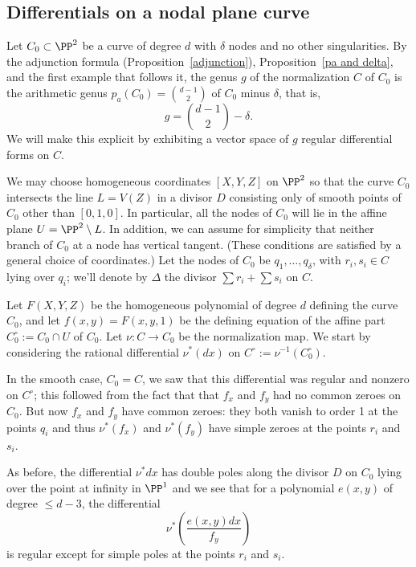 \subsection{Differentials on a nodal plane curve}\label{canonical series on nodal plane curves}

Let $C_{0} \subset \PP^2$  be a curve of degree $d$ with $\delta$ nodes and no other singularities. By the adjunction
formula (Proposition~\ref{adjunction}), Proposition~\ref{pa and delta}, and the first example that follows it, 
the genus $g$ of the normalization $C$ of $C_{0}$ is
the arithmetic genus $p_{a}(C_{0}) = \binom{d-1}{2}$ of $C_{0}$ minus $\delta$, that is,
$$
g = \binom{d-1}{2} -\delta.
$$
We will make this explicit by exhibiting a vector space of $g$ regular differential forms on $C$.

We may choose homogeneous coordinates  $[X,Y,Z]$ on $\PP^2$ so that the curve $C_0$ intersects the line $L = V(Z)$ in a divisor $D$ consisting only of smooth points of $C_{0}$  other than $[0,1,0]$. In particular,  all the nodes of $C_0$ will lie in the affine plane $U = \PP^2 \setminus L$.
In addition, we can assume for simplicity that  neither branch of $C_0$ at a node has vertical tangent. (These conditions are satisfied by a general choice of coordinates.) Let the nodes of $C_0$ be $q_1,\dots,q_\delta$, with $r_i, s_i \in C$ lying over $q_i$; we'll denote by $\Delta$ the divisor $\sum r_i + \sum s_i$ on $C$.

Let $F(X,Y,Z)$ be the homogeneous polynomial of degree $d$ defining the curve $C_0$, and let $f(x,y) = F(x,y,1)$ be the defining equation of the affine part $C_{0}^{\circ}:= C_0 \cap U$ of $C_0$. Let $\nu: C\to C_0$ be the normalization map. We start by considering the rational differential 
$\nu^*(dx)$ on 
$C^{\circ}:= \nu^{-1}(C_{0}^{\circ})$. 

In the smooth case, $C_{0}=C$, we saw that this differential was regular and nonzero on $C^{\circ}$; this followed from the fact that 
that $f_{x}$ and $f_{y}$ had no common zeroes on $C_0$. But now $f_{x}$ and $f_{y}$ have common zeroes: they both vanish to order 1 at the points $q_{i}$ and thus $\nu^*(f_{x})$ and $\nu^*(f_{y})$ have simple zeroes at the points $r_i$ and $s_i$. 

As before, the differential $\nu^*dx$ has  double poles along the divisor $D$ on $C_{0}$ lying over the point at infinity in $\PP^{1}$
and we see that for a polynomial $e(x,y)$ of degree $\leq d-3$, the differential
$$
\nu^*( \frac{e(x,y)dx}{f_{y}})
$$
is regular except for simple poles at the points $r_i$ and $s_i$.

